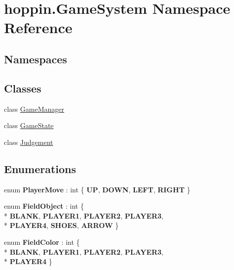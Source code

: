 \hypertarget{namespacehoppin_1_1_game_system}{}\section{hoppin.\+Game\+System Namespace Reference}
\label{namespacehoppin_1_1_game_system}
\subsection*{Namespaces}
\begin{DoxyCompactItemize}
\end{DoxyCompactItemize}
\subsection*{Classes}
\begin{DoxyCompactItemize}
\item 
class \hyperlink{classhoppin_1_1_game_system_1_1_game_manager}{Game\+Manager}
\item 
class \hyperlink{classhoppin_1_1_game_system_1_1_game_state}{Game\+State}
\item 
class \hyperlink{classhoppin_1_1_game_system_1_1_judgement}{Judgement}
\end{DoxyCompactItemize}
\subsection*{Enumerations}
\begin{DoxyCompactItemize}
\item 
enum {\bfseries Player\+Move} \+: int \{ {\bfseries UP}, 
{\bfseries D\+O\+WN}, 
{\bfseries L\+E\+FT}, 
{\bfseries R\+I\+G\+HT}
 \}\hypertarget{namespacehoppin_1_1_game_system_a09ca9399921bb6094069df368b7c3f0f}{}\label{namespacehoppin_1_1_game_system_a09ca9399921bb6094069df368b7c3f0f}

\item 
enum {\bfseries Field\+Object} \+: int \{ \\*
{\bfseries B\+L\+A\+NK}, 
{\bfseries P\+L\+A\+Y\+E\+R1}, 
{\bfseries P\+L\+A\+Y\+E\+R2}, 
{\bfseries P\+L\+A\+Y\+E\+R3}, 
\\*
{\bfseries P\+L\+A\+Y\+E\+R4}, 
{\bfseries S\+H\+O\+ES}, 
{\bfseries A\+R\+R\+OW}
 \}\hypertarget{namespacehoppin_1_1_game_system_ac47818bbe2ebead6a8ff0f1c2655b3d0}{}\label{namespacehoppin_1_1_game_system_ac47818bbe2ebead6a8ff0f1c2655b3d0}

\item 
enum {\bfseries Field\+Color} \+: int \{ \\*
{\bfseries B\+L\+A\+NK}, 
{\bfseries P\+L\+A\+Y\+E\+R1}, 
{\bfseries P\+L\+A\+Y\+E\+R2}, 
{\bfseries P\+L\+A\+Y\+E\+R3}, 
\\*
{\bfseries P\+L\+A\+Y\+E\+R4}
 \}\hypertarget{namespacehoppin_1_1_game_system_a1aae7fa36a9608e1d1e8cf24a22ec45a}{}\label{namespacehoppin_1_1_game_system_a1aae7fa36a9608e1d1e8cf24a22ec45a}

\end{DoxyCompactItemize}
